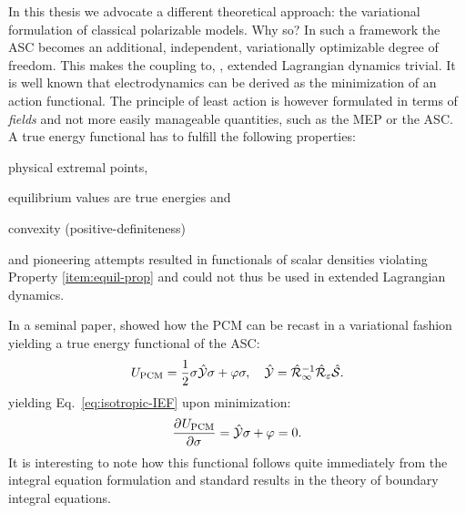 In this thesis we advocate a different theoretical approach: the
variational formulation of classical polarizable models.
Why so? In such a framework the \acrshort{ASC} becomes an additional,
independent, variationally optimizable degree of freedom.
This makes the coupling to, \eg, extended Lagrangian dynamics
trivial.\autocite{Car1985-jw}
It is well known that electrodynamics can be derived as the minimization
of an action functional.\autocite{Jackson1999}
The principle of least action is however formulated in terms of
\emph{fields} and not more easily manageable quantities, such as the
\acrshort{MEP} or the \acrshort{ASC}.
A true energy functional has to fulfill the following
properties:\autocite{Solis2013-ef}
\begin{enumerate*}[label={\alph*)},font={\color{PMS1797}}]
    \item physical extremal points,
    \item equilibrium values are true energies \label{item:equil-prop} and
    \item convexity (positive-definiteness)
\end{enumerate*}
\citeauthor{Allen2001-fp} and \citeauthor{Attard2003-vr} pioneering
attempts resulted in functionals of scalar densities violating
Property \ref{item:equil-prop} and could not thus be used in extended Lagrangian
dynamics.\autocite{Allen2001-fp, Attard2003-vr, Attard2007-lk}

In a seminal paper, \citeauthor{Lipparini2010-be} showed how the
\acrshort{PCM} can be recast in a variational fashion yielding a true energy
functional of the \acrshort{ASC}:\autocite{Lipparini2010-be, Lipparini2011-aj, Lipparini2016-mo}
\begin{equation}\label{eq:pcm-functional}
 U_\mathrm{PCM} = \frac{1}{2}\sigma\hat{\mathcal{Y}}\sigma + \varphi\sigma,
 \quad
  \hat{\mathcal{Y}} = \hat{\mathcal{R}}_\infty^{-1}\hat{\mathcal{R}}_\varepsilon\hat{\mathcal{S}}.
\end{equation}
yielding Eq.~\eqref{eq:isotropic-IEF} upon minimization:
\begin{equation}\label{eq:pcm-stationarity}
  \frac{\partial^{}U_\mathrm{PCM}} {\partial \sigma^{}} = \hat{\mathcal{Y}}\sigma + \varphi = 0.
\end{equation}
It is interesting to note how this functional follows quite immediately
from the integral equation formulation and standard results in the
theory of boundary integral equations.\autocite{Hsiao2008-xb}


